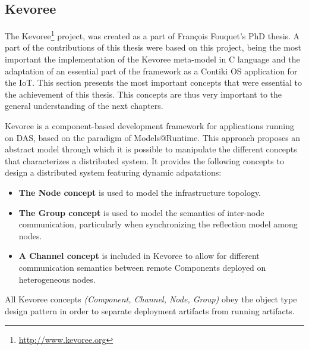 
\subsection{Kevoree}
The Kevoree\footnote{\url{http://www.kevoree.org}} project, was created as a part of Fran{\c{c}}ois Fouquet's PhD thesis.
A part of the contributions of this thesis were based on this project, being the most important the implementation of the Kevoree meta-model in C language and the adaptation of an essential part of the framework as a Contiki OS\cite{dunkels2004contiki} application for the IoT.
This section presents the most important concepts that were essential to the achievement of this thesis.
This concepts are thus very important to the general understanding of the next chapters.

Kevoree is a component-based development framework for applications running on DAS, based on the paradigm of Models@Runtime.
This approach proposes an abstract model through which it is possible to manipulate the different concepts that characterizes a distributed system.
It provides the following concepts to design a distributed system featuring dynamic adpatations:
\begin{itemize}
	\item \textbf{The Node concept} is used to model the infrastructure topology.
	\item \textbf{The Group concept} is used to model the semantics of inter-node communication, particularly when synchronizing the reflection model among nodes.
	\item \textbf{A Channel concept} is included in Kevoree to allow for different communication semantics between remote Components deployed on heterogeneous nodes. 
\end{itemize}
All Kevoree concepts \textit{(Component, Channel, Node, Group)} obey the object type design pattern\cite{woolf1996type} in order to separate deployment artifacts from running artifacts.


